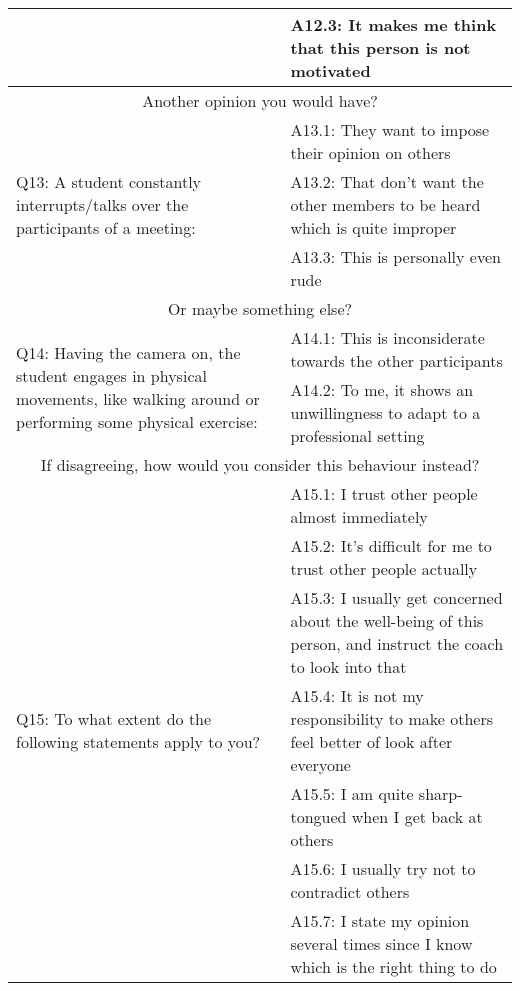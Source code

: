 \begin{longtable}{|  p{}  |  p{} |}
   &  \hspace{0.3cm} A12.3: It makes me think that this person is not motivated  \\
\hline
\multicolumn{2}{|c|}{Another opinion you would have?} \\
\hline
\multirow{3}{6cm}{Q13: A student constantly interrupts/talks over the participants of a meeting:} & 
    \hspace{0.3cm} A13.1: They want to impose their opinion on others \\
    & \hspace{0.3cm} A13.2: That don't want the other members to be heard which is quite improper \\
    & \hspace{0.3cm} A13.3: This is personally even rude  \\
\hline
\multicolumn{2}{|c|}{Or maybe something else?} \\
\hline
\multirow{2}{6cm}{Q14: Having the camera on, the student engages in physical movements, like walking around or performing some physical exercise:} & 
    \hspace{0.3cm} A14.1: This is inconsiderate towards the other participants \\
    & \hspace{0.3cm} A14.2: To me, it shows an unwillingness to adapt to a professional setting \\
\hline
\multicolumn{2}{|c|}{If disagreeing, how would you consider this behaviour instead?} \\
\hline
\multirow{7}{6cm}{Q15: To what extent do the following statements apply to you?} & 
    \hspace{0.3cm} A15.1: I trust other people almost immediately \\
    & \hspace{0.3cm} A15.2: It's difficult for me to trust other people actually \\
    & \hspace{0.3cm} A15.3: I usually get concerned about the well-being of this person, and instruct the coach to look into that \\
    & \hspace{0.3cm} A15.4: It is not my responsibility to make others feel better of look after everyone \\
    & \hspace{0.3cm} A15.5: I am quite sharp-tongued when I get back at others \\
    & \hspace{0.3cm} A15.6: I usually try not to contradict others \\
    & \hspace{0.3cm} A15.7: I state my opinion several times since I know which is the right thing to do
     \\
\hline
\end{longtable}


